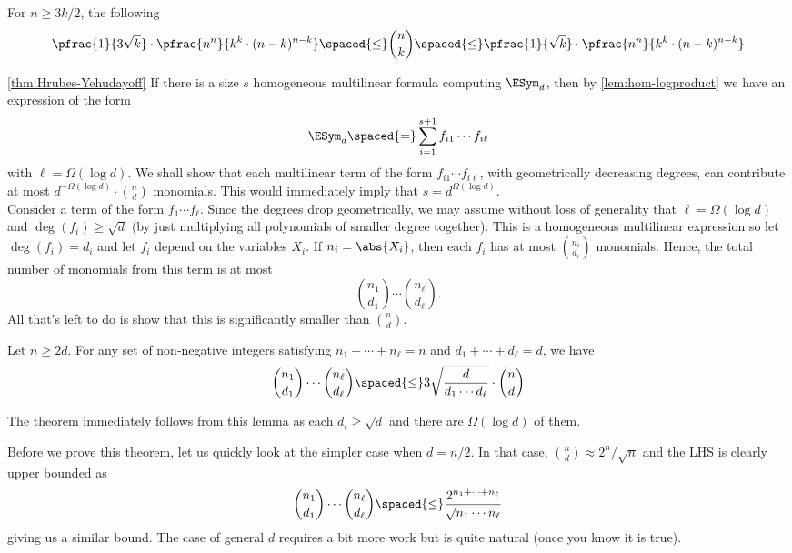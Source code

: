 \begin{lemma}\label{lem:stirling-binom} For $n \geq 3k/2$, the following 
\[
\pfrac{1}{3\sqrt{k}} \cdot \pfrac{n^n}{k^k \cdot (n-k)^{n-k}} \spaced{\leq} \binom{n}{k} \spaced{\leq} \pfrac{1}{\sqrt{k}} \cdot \pfrac{n^n}{k^k \cdot (n-k)^{n-k}}
\]
\end{lemma}

\begin{proofof}{\autoref{thm:Hrubes-Yehudayoff}}
If there is a size $s$ homogeneous multilinear formula computing $\ESym_d$, then by \autoref{lem:hom-logproduct} we have an expression of the form
\[
\ESym_d \spaced{=} \sum_{i=1}^{s+1} f_{i1} \cdots f_{i\ell}
\]
with $\ell = \Omega(\log d)$.
We shall show that each multilinear term of the form $f_{i1} \cdots f_{i\ell}$, with geometrically decreasing degrees, can contribute at most $d^{-\Omega(\log d)} \cdot \binom{n}{d}$ monomials.
This would immediately imply that $s = d^{\Omega(\log d)}$. \\


Consider a term of the form $f_1 \cdots f_\ell$. Since the degrees drop geometrically, we may assume without loss of generality that $\ell = \Omega(\log d)$ and $\deg(f_i) \geq \sqrt{d}$ (by just multiplying all polynomials of smaller degree together). This is a homogeneous multilinear expression so let $\deg(f_i) = d_i$ and let $f_i$ depend on the variables $X_i$. If $n_i = \abs{X_i}$, then each $f_i$ has at most $\binom{n_i}{d_i}$ monomials. Hence, the total number of monomials from this term is at most
\[
\binom{n_1}{d_1} \cdots \binom{n_\ell}{d_\ell}.
\]
All that's left to do is show that this is significantly smaller than $\binom{n}{d}$. 

\begin{lemma}[\cite{HY11a}]\label{lem:HY-prod-binom}
Let $n\geq 2d$. For any set of non-negative integers satisfying $n_1 + \cdots + n_\ell = n$ and $d_1 + \cdots + d_\ell = d$, we have
\[
\binom{n_1}{d_1} \cdots \binom{n_\ell}{d_\ell} \spaced{\leq} 3 \sqrt{\frac{d}{d_1 \cdots d_\ell}} \cdot \binom{n}{d}
\]
\end{lemma}
The theorem immediately follows from this lemma as each $d_i \geq \sqrt{d}$ and there are $\Omega(\log d)$ of them. 

Before we prove this theorem, let us quickly look at the simpler case when $d = n/2$. In that case, $\binom{n}{d} \approx 2^n / \sqrt{n}$ and the LHS is clearly upper bounded as
\[
\binom{n_1}{d_1} \cdots \binom{n_\ell}{d_\ell} \spaced{\leq} \frac{2^{n_1+ \cdots + n_\ell}}{\sqrt{n_1 \cdots n_\ell}}
\]
giving us a similar bound. The case of general $d$ requires a bit more work but is quite natural (once you know it is true). 


\end{proofof}
